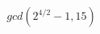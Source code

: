 \documentclass[preview]{standalone}
\begin{document}
\begin{align*}
gcd(2^{4/2} - 1, 15)
\end{align*}
\end{document}
